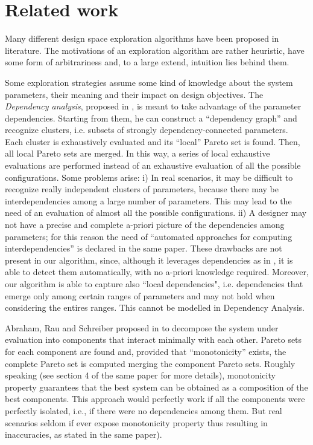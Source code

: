 \section{Related work}
Many different design space exploration algorithms have been proposed
in literature.  The motivations of an exploration
algorithm are rather heuristic, have some form of arbitrariness and,
to a large extend, intuition lies behind them.

Some exploration strategies assume some kind of knowledge about the
system parameters, their meaning and their impact on design
objectives.  The \emph{Dependency analysis}, proposed in
\cite{givargis_tvlsi02}, is meant to take advantage of the parameter
dependencies. Starting from them, he can construct a ``dependency graph''
and recognize clusters, i.e. subsets of strongly dependency-connected
parameters. Each cluster is exhaustively evaluated and its ``local''
Pareto set is found. Then, all local Pareto sets are merged. In this
way, a series of local exhaustive evaluations are performed instead of
an exhaustive evaluation of all the possible configurations. Some
problems arise: i) In real scenarios, it may be difficult to recognize
really independent clusters of parameters, because there may be
interdependencies among a large number of parameters. This may lead to
the need of an evaluation of almost all the possible configurations.
ii) A designer may not have a precise and complete a-priori picture of
the dependencies among parameters; for this reason the need of
``automated approaches for computing interdependencies'' is declared
in the same paper.  These drawbacks are not present in our algorithm,
since, although it leverages dependencies as in
\cite{givargis_tvlsi02}, it is able to detect them automatically, with
no a-priori knowledge required. Moreover, our algorithm is able to
capture also ``local dependencies", i.e. dependencies that emerge only
among certain ranges of parameters and may not hold when considering
the entires ranges. This cannot be modelled in Dependency Analysis. 

Abraham, Rau and Schreiber proposed in \cite{santosh_hptr00} to decompose
the system under evaluation into components that interact minimally
with each other. Pareto sets for each component are found and, provided
that ``monotonicity'' exists, the complete Pareto set is computed
merging the component Pareto sets. Roughly speaking (see section 4
of the same paper for more details), monotonicity property guarantees
that the best system can be obtained as a composition of the best
components. This approach would perfectly work if all the components
were perfectly isolated, i.e., if there were no dependencies among
them. But real scenarios seldom if ever
expose monotonicity property thus resulting in inaccuracies, as stated in the same paper).

